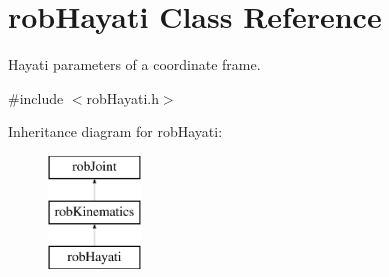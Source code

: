 \hypertarget{classrob_hayati}{\section{rob\-Hayati Class Reference}
\label{classrob_hayati}
}


Hayati parameters of a coordinate frame.  




{\ttfamily \#include $<$rob\-Hayati.\-h$>$}

Inheritance diagram for rob\-Hayati\-:\begin{figure}[H]
\begin{center}
\leavevmode
\includegraphics[height=3.000000cm]{d8/da9/classrob_hayati}
\end{center}
\end{figure}
